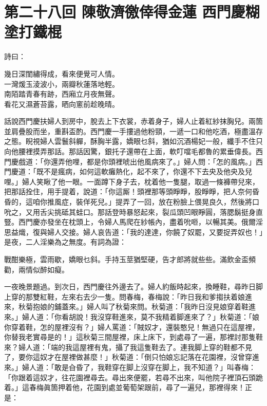 
\chapter*{第二十八回 陳敬濟徼倖得金蓮 西門慶糊塗打鐵棍}


詩曰：

\begin{myquote}
幾日深閨繡得成，看來便覺可人情。\\一灣煖玉淩波小，兩瓣秋蓮落地輕。\\南陌踏青春有跡，西廂立月夜無聲。\\看花又濕蒼苔露，晒向窻前趁晚晴。
\end{myquote}

話說西門慶扶婦人到房中，脫去上下衣裳，赤着身子，婦人止着紅紗抹胸兒。{}兩箇並肩疊股而坐，重斟盃酌。西門慶一手摟過他粉頸，一遞一口和他吃酒，極盡溫存之態。睨視婦人雲鬟斜軃，酥胸半露，嬌眼乜斜，猶如沉酒楊妃一般，{}纖手不住只向他腰裡摸弄那話。那話因驚，銀托子還帶在上面，軟叮噹毛都魯的累垂偉長。西門慶戲道：「你還弄他哩，都是你頭裡唬出他風病來了。」婦人問：「怎的風病。」西門慶道：「既不是瘋病，如何這軟癱熱化，起不來了，你還不下去央及他央及兒哩。」婦人笑瞅了他一眼。一面蹲下身子去，枕着他一隻腿，取過一條褲帶兒來，把那話拴住，用手提着，說道：「你這厮！頭裡那等頭睜睜，股睜睜，把人奈何昏昏的，這咱你推風症，裝佯死兒。」{}提弄了一回，放在粉臉上偎晃良久，然後將口吮之，又用舌尖挑砥其蛙口。那話登時暴怒起來，裂瓜頭凹眼睜圓，落腮鬍挺身直豎。西門慶亦發坐在枕頭上，令婦人馬爬在紗帳內，盡着吮咂，以暢其美。俄爾淫思益熾，復與婦人交接。婦人哀告道：「我的達達，你饒了奴罷，又要捉弄奴也！」是夜，二人淫樂為之無度。有詞為證：

\begin{myquote}
戰酣樂極，雲雨歇，嬌眼乜斜。手持玉莖猶堅硬，告才郎將就些些。滿飲金盃頻勸，兩情似醉如癡。
\end{myquote}

一夜晚景題過。到次日，西門慶往外邊去了。婦人約飯時起來，換睡鞋，尋昨日脚上穿的那雙紅鞋，左來右去少一隻。問春梅，春梅說：「昨日我和爹搊扶着娘進來，秋菊抱娘的鋪蓋來。」婦人叫了秋菊來問。秋菊道：「我昨日沒見娘穿着鞋進來。」婦人道：「你看胡說！我沒穿鞋進來，莫不我精着脚進來了？」秋菊道：「娘你穿着鞋，怎的屋裡沒有？」{}婦人罵道：「賊奴才，還裝憨兒！無過只在這屋裡，你替我老實尋是的！」這秋菊三間屋裡，床上床下，到處尋了一遍，那裡討那隻鞋來？婦人道：「端的我這屋裡有鬼，攝了我這隻鞋去了。連我脚上穿的鞋都不見了，要你這奴才在屋裡做甚麼！」秋菊道：「倒只怕娘忘記落在花園裡，沒曾穿進來。」婦人道：「敢是㒲昏了，{}我鞋穿在脚上沒穿在脚上，我不知道？」叫春梅：「你跟着這奴才，往花園裡尋去。尋出來便罷，若尋不出來，叫他院子裡頂石頭跪着。」這春梅眞箇押着他，花園到處並葡萄架跟前，尋了一遍兒，那裡得來！正是：

